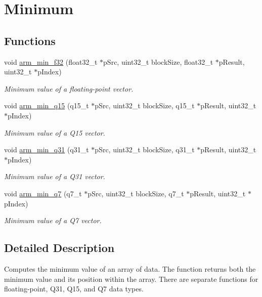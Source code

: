 \hypertarget{group__Min}{}\section{Minimum}
\label{group__Min}
\subsection*{Functions}
\begin{DoxyCompactItemize}
\item 
void \hyperlink{group__Min_gaf62b1673740fc516ea64daf777b7d74a}{arm\+\_\+min\+\_\+f32} (float32\+\_\+t $\ast$p\+Src, uint32\+\_\+t block\+Size, float32\+\_\+t $\ast$p\+Result, uint32\+\_\+t $\ast$p\+Index)
\begin{DoxyCompactList}\small\item\em Minimum value of a floating-\/point vector. \end{DoxyCompactList}\item 
void \hyperlink{group__Min_gad065e37535ebb726750ac1545cb3fa6f}{arm\+\_\+min\+\_\+q15} (q15\+\_\+t $\ast$p\+Src, uint32\+\_\+t block\+Size, q15\+\_\+t $\ast$p\+Result, uint32\+\_\+t $\ast$p\+Index)
\begin{DoxyCompactList}\small\item\em Minimum value of a Q15 vector. \end{DoxyCompactList}\item 
void \hyperlink{group__Min_gab20faeceb5ff5d2d9dd628c2ecf41303}{arm\+\_\+min\+\_\+q31} (q31\+\_\+t $\ast$p\+Src, uint32\+\_\+t block\+Size, q31\+\_\+t $\ast$p\+Result, uint32\+\_\+t $\ast$p\+Index)
\begin{DoxyCompactList}\small\item\em Minimum value of a Q31 vector. \end{DoxyCompactList}\item 
void \hyperlink{group__Min_ga3631d38ac8d715fc14f6f1b343f4c4ed}{arm\+\_\+min\+\_\+q7} (q7\+\_\+t $\ast$p\+Src, uint32\+\_\+t block\+Size, q7\+\_\+t $\ast$p\+Result, uint32\+\_\+t $\ast$p\+Index)
\begin{DoxyCompactList}\small\item\em Minimum value of a Q7 vector. \end{DoxyCompactList}\end{DoxyCompactItemize}


\subsection{Detailed Description}
Computes the minimum value of an array of data. The function returns both the minimum value and its position within the array. There are separate functions for floating-\/point, Q31, Q15, and Q7 data types. 

